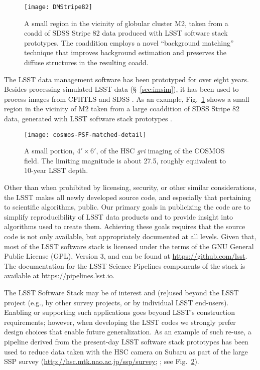 \begin{figure}
%
%
\texttt{[image: DMStripe82]}
\caption{
A small region in the vicinity of globular cluster M2, taken from a coadd of SDSS Stripe 82 data produced with LSST software stack prototypes. The coaddition employs a novel ``background matching'' technique that improves background estimation and preserves the diffuse structures in the resulting coadd.}
\label{Fig:DMStripe82}
\end{figure}


The LSST data management software has been prototyped for over eight
years. Besides processing simulated LSST data
(\S~\ref{sec:imsim}), it has been used to process images from CFHTLS \citep{2012SPIE.8448E..0MC}
and SDSS \citep{2009ApJS..182..543A}. As an example,
Fig.~\ref{Fig:DMStripe82} shows a small region in the vicinity of M2
taken from a large coaddition of SDSS Stripe 82 data, generated with LSST
software stack prototypes \citep{DMTN-035}.
\\

\begin{figure}
\texttt{[image: cosmos-PSF-matched-detail]}
\caption{
  A small portion, $4' \times 6'$, of the HSC \textit{gri} imaging of
  the COSMOS field.  The limiting magnitude is about 27.5, roughly
  equivalent to 10-year LSST depth.
  }
\label{Fig:HSC_cosmos}
\end{figure}

Other than when prohibited by licensing, security, or other similar
considerations, the LSST makes all newly developed source code, and especially
that pertaining to scientific algorithms, public.  Our primary goals in
publicizing the code are to simplify reproducibility of LSST data products
and to provide insight into algorithms used to create them.  Achieving these goals requires
that the source code is not only available, but appropriately documented at all
levels.
Given that, most of the LSST software stack is licensed under the terms of the GNU General
Public License (GPL), Version 3, and can be found at \url{https://github.com/lsst}.
The documentation for the LSST Science Pipelines components of the stack is available at
\url{https://pipelines.lsst.io}.

The LSST Software Stack may be of interest and (re)used beyond the LSST project (e.g.,
by other survey projects, or by individual LSST end-users).  Enabling
or supporting such applications goes beyond LSST’s construction
requirements; however, when developing the LSST codes we strongly
prefer design choices that enable future generalization.  As an example of such
re-use, a pipeline derived from the present-day LSST software stack prototypes
has been used to reduce data taken with the HSC camera \citep{2018PASJ...70S...1M} on
Subaru as part of the large SSP survey (\url{http://hsc.mtk.nao.ac.jp/ssp/survey};
\citet{2018PASJ...70S...4A,2018PASJ...70S...5B}; see Fig.~\ref{Fig:HSC_cosmos}).



